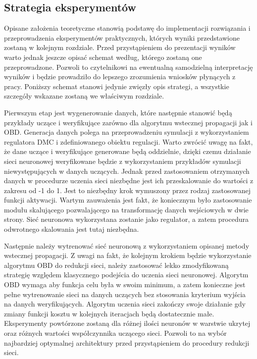 \subsection{Strategia eksperymentów}
Opisane założenia teoretyczne stanowią podstawę do implementacji rozwiązania i przeprowadzenia eksperymentów praktycznych, których wyniki przedstawione zostaną w kolejnym rozdziale. Przed przystąpieniem do prezentacji wyników warto jednak jeszcze opisać schemat według, którego zostaną one przeprowadzone. Pozwoli to czytelnikowi na ewentualną samodzielną interpretację wyników i będzie prowadziło do lepszego zrozumienia wniosków płynących z pracy. Poniższy schemat stanowi jedynie zwięzły opis strategi, a wszystkie szczegóły wskazane zostaną we właściwym rozdziale. 
\par Pierwszym etap jest wygenerowanie danych, które następnie stanowić będą przykłady uczące i weryfikujące zarówno dla algorytmu wstecznej propagacji jak i OBD. Generacja danych polega na przeprowadzeniu symulacji z wykorzystaniem regulatora DMC i zdefiniowanego obiektu regulacji. Warto zwrócić uwagę na fakt, że dane uczące i weryfikujące generowane będą oddzielnie, dzięki czemu działanie sieci neuronowej weryfikowane będzie z wykorzystaniem przykładów symulacji niewystępujących w danych uczących. Jednak przed zastosowaniem otrzymanych danych w procedurze uczenia sieci niezbędne jest ich przeskalowanie do wartości z zakresu od -1 do 1. Jest to niezbędny krok wymuszony przez rodzaj zastosowanej funkcji aktywacji. Wartym zauważenia jest fakt, że koniecznym było zastosowanie modułu skalującego pozwalającego na transformację danych wejściowych w dwie strony. Sieć neuronowa wykorzystana zostanie jako regulator, a zatem procedura odwrotnego skalowania jest tutaj niezbędna. 
\par Następnie należy wytrenować sieć neuronową z wykorzystaniem opisanej metody wstecznej propagacji. Z uwagi na fakt, że kolejnym krokiem będzie wykorzystanie algorytmu OBD do redukcji sieci, należy zastosować lekko zmodyfikowaną strategię względem klasycznego podejścia do uczenia sieci neuronowej. Algorytm OBD wymaga aby funkcja celu była w swoim minimum, a zatem konieczne jest pełne wytrenowanie sieci na danych uczących bez stosowania kryterium wyjścia na danych weryfikujących. Algorytm uczenia sieci zakończy swoje działanie gdy zmiany funkcji kosztu w kolejnych iteracjach będą dostatecznie małe. Eksperymenty powtórzone zostaną dla różnej ilości neuronów w warstwie ukrytej oraz różnych wartości współczynnika uczącego sieci. Pozwoli to na wybór najbardziej optymalnej architektury przed przystąpieniem do procedury redukcji sieci. 
